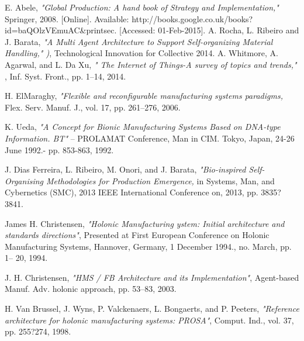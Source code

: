 \documentclass[10pt,letterpaper,twocolumn]{IEEEtran}
\begin{document}
\begin{thebibliography}{99}
	E. Abele, 
	\emph{"Global Production: A hand book of Strategy and Implementation,"} Springer, 2008. [Online]. Available: http://books.google.co.uk/books?id=baQOlzVEmuAC\&printsec. [Accessed: 01-Feb-2015].
	 A. Rocha, L. Ribeiro and J. Barata,
	\emph { "A Multi Agent Architecture to Support Self-organizing Material Handling," )}, Technological Innovation for Collective 2014.
	 A. Whitmore, A. Agarwal, and L. Da Xu, 
	\emph{ " The Internet of Things-A survey of topics and trends," }, Inf. Syst. Front., pp. 1--14, 2014.
	
	H. ElMaraghy, 
	\emph{"Flexible and reconfigurable manufacturing systems paradigms,} Flex. Serv. Manuf. J., vol. 17, pp. 261--276, 2006.
		
	
	 K. Ueda, 
	\emph{"A Concept for Bionic Manufacturing Systems Based on DNA-type Information. BT"} -- PROLAMAT Conference, Man in CIM. Tokyo, Japan, 24-26 June 1992.- pp. 853-863, 1992.
	
	 J. Dias Ferreira, L. Ribeiro, M. Onori, and J. Barata, 
	\emph{"Bio-inspired Self-Organising Methodologies for Production Emergence,} in Systems, Man, and Cybernetics (SMC), 2013 IEEE International Conference on, 2013, pp. 3835?3841.
	

	James H. Christensen,
	\emph{"Holonic Manufacturing ystem: Initial architecture and standards directions"}, Presented at First European Conference on Holonic Manufacturing Systems, Hannover, Germany, 1 December 1994., no. March, pp. 1-- 20, 1994. 

	 J. H. Christensen, 
	\emph{"HMS / FB Architecture and its Implementation"}, Agent-based Manuf. Adv. holonic approach, pp. 53--83, 2003.	
				
	H. Van Brussel, J. Wyns, P. Valckenaers, L. Bongaerts, and P. Peeters, \emph{"Reference architecture for holonic manufacturing systems: PROSA"}, Comput. Ind., vol. 37, pp. 255?274, 1998.
	

\end{thebibliography}
\end{document}
